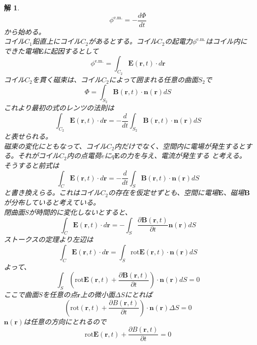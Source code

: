 \documentclass{jsarticle}
\newtheorem{ans}{解}[section]
\begin{document}
\begin{ans}~\\
    \begin{equation*}
        \phi^{\mathrm{e.m.}}=-\frac{d\Phi}{dt}
    \end{equation*}
    から始める。\\
    コイル\(C_{1}\)鉛直上にコイル\(C_{2}\)があるとする。コイル\(C_{2}\)の起電力\(\phi^{\mathrm{e.m.}}\)はコイル内にできた電場\(\bm{E}\)に起因するとして
    \begin{equation*}
        \phi^{\mathrm{e.m.}}=\int_{C_{2}}\bm{E}(\bm{r},t)\cdot d\bm{r}
    \end{equation*}
    コイル\(C_{2}\)を貫く磁束は、コイル\(C_{2}\)によって囲まれる任意の曲面\(S_{2}\)で
    \begin{equation*}
        \Phi=\int_{S_{2}}\bm{B}(\bm{r},t)\cdot\bm{n}(\bm{r})dS
    \end{equation*}
    これより最初の式のレンツの法則は
    \begin{equation*}
        \int_{C_{2}}\bm{E}(\bm{r},t)\cdot d\bm{r}=-\frac{d}{dt}\int_{S_{2}}\bm{B}(\bm{r},t)\cdot\bm{n}(\bm{r})dS
    \end{equation*}
    と表せられる。\\
    磁束の変化にともなって、コイル\(C_{2}\)内だけでなく、空間内に電場が発生するとする。それがコイル\(C_{2}\)内の点電荷\(e\)に\(q\bm{E}\)の力を与え、電流が発生する
    と考える。そうすると前式は
    \begin{equation*}
        \int_{C}\bm{E}(\bm{r},t)\cdot d\bm{r}=-\frac{d}{dt}\int_{S}\bm{B}(\bm{r},t)\cdot\bm{n}(\bm{r})dS
    \end{equation*}
    と書き換えらる。これはコイル\(C_{2}\)の存在を仮定せずとも、空間に電場\(\bm{E}\)、磁場\(\bm{B}\)が分布していると考えている。\\
    閉曲面\(S\)が時間的に変化しないとすると、
    \begin{equation*}
        \int_{C}\bm{E}(\bm{r},t)\cdot d\bm{r} = -\int_{S}\frac{\partial\bm{B}(\bm{r},t)}{\partial t}\bm{n}(\bm{r})dS
    \end{equation*}
    ストークスの定理より左辺は
    \begin{equation*}
        \int_{C}\bm{E}(\bm{r},t)\cdot d\bm{r} = \int_{S}\mathrm{rot}\bm{E}(\bm{r},t)\cdot\bm{n}(\bm{r})dS
    \end{equation*}
    よって、
    \begin{equation*}
        \int_{S}\left(\mathrm{rot}\bm{E}(\bm{r},t)+\frac{\partial\bm{B}(\bm{r},t)}{\partial t}\right)\cdot\bm{n}(\bm{r})dS = 0
    \end{equation*}
    ここで曲面\(S\)を任意の点\(\bm{r}\)上の微小面\(\Delta S\)にとれば
    \begin{equation*}
        \left(\mathrm{rot}(\bm{r},t)+\frac{\partial B(\bm{r},t)}{\partial t}\right)\cdot\bm{n}(\bm{r})\Delta S = 0
    \end{equation*}
    \(\bm{n}(\bm{r})\)は任意の方向にとれるので
    \begin{equation*}
        \mathrm{rot}\bm{E}(\bm{r},t)+\frac{\partial B(\bm{r},t)}{\partial t} = 0
    \end{equation*}
\end{ans}
\end{document}

